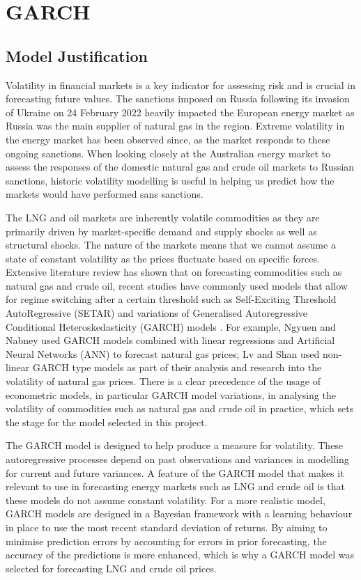 \section{GARCH}
\subsection{Model Justification}
Volatility in financial markets is a key indicator for assessing risk and is crucial in forecasting future values. The sanctions imposed on Russia following its invasion of Ukraine on 24 February 2022 heavily impacted the European energy market as Russia was the main supplier of natural gas in the region. Extreme volatility in the energy market has been observed since, as the market responds to these ongoing sanctions. When looking closely at the Australian energy market to assess the responses of the domestic natural gas and crude oil markets to Russian sanctions, historic volatility modelling is useful in helping us predict how the markets would have performed sans sanctions.
\medskip

The LNG and oil markets are inherently volatile commodities as they are primarily driven by market-specific demand and supply shocks as well as structural shocks. The nature of the markets means that we cannot assume a state of constant volatility as the prices fluctuate based on specific forces. Extensive literature review has shown that on forecasting commodities such as natural gas and crude oil, recent studies have commonly used models that allow for regime switching after a certain threshold such as Self-Exciting Threshold AutoRegressive (SETAR) and variations of Generalised Autoregressive Conditional Heteroskedasticity (GARCH) models \cite{alice1}. For example, Ngyuen and Nabney \cite{alice2} used GARCH models combined with linear regressions and Artificial Neural Networks (ANN) to forecast natural gas prices; Lv and Shan \cite{alice3} used non-linear GARCH type models as part of their analysis and research into the volatility of natural gas prices. There is a clear precedence of the usage of econometric models, in particular GARCH model variations, in analysing the volatility of commodities such as natural gas and crude oil in practice, which sets the stage for the model selected in this project.
\medskip

The GARCH model is designed to help produce a measure for volatility. These autoregressive processes depend on past observations and variances in modelling for current and future variances. A feature of the GARCH model that makes it relevant to use in forecasting energy markets such as LNG and crude oil is that these models do not assume constant volatility. For a more realistic model, GARCH models are designed in a Bayesian framework with a learning behaviour in place to use the most recent standard deviation of returns. By aiming to minimise prediction errors by accounting for errors in prior forecasting, the accuracy of the predictions is more enhanced, which is why a GARCH model was selected for forecasting LNG and crude oil prices.


